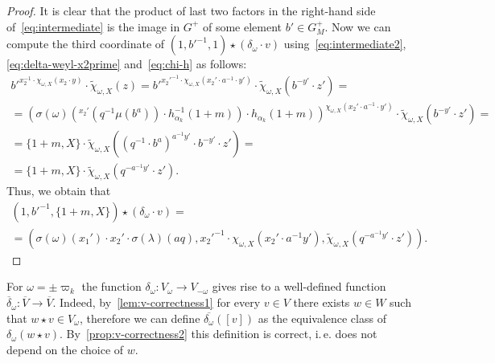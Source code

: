 \begin{proof}
It is clear that the product of last two factors in the right-hand side of~\eqref{eq:intermediate} is
 the image in $G^+$ of some element $b' \in G_M^+$.
Now we can compute the third coordinate of $(1, {b'}^{-1}, 1) \star (\delta_\omega \cdot v)$ using~\eqref{eq:intermediate2}, \eqref{eq:delta-weyl-x2prime} and~\eqref{eq:chi-h} as follows:
\begin{multline*}
 {b'}^{x_2^{-1} \cdot \chi_{\omega, X}(x_2 \cdot y) } \cdot \widetilde{\chi}_{\omega, X}(z) =
 {b'}^{{x_2'}^{-1} \cdot \chi_{\omega, X}(x_2' \cdot a^{-1} \cdot y') } \cdot \widetilde{\chi}_{\omega, X}(b^{-y'} \cdot z') = \\
 = \left(\sigma(\omega)\left( {}^{x_2'}(q^{-1} \mu(b^a)) \cdot h^{-1}_{\alpha_k}(1+m)\right) \cdot h_{\alpha_k}(1+m)\right)^{\chi_{\omega, X}(x_2' \cdot a^{-1} \cdot y')} \cdot \widetilde{\chi}_{\omega, X}(b^{-y'} \cdot z') = \\
 = \{1+m, X\} \cdot \widetilde{\chi}_{\omega, X}\left( \left( q^{-1} \cdot b^a \right)^{a^{-1}y'} \cdot b^{-y'} \cdot z' \right) = \\
 = \{1+m, X\} \cdot \widetilde{\chi}_{\omega, X}(q^{-a^{-1}y'} \cdot z').
\end{multline*}
Thus, we obtain that
\begin{multline*}
 (1, {b'}^{-1}, \{1 + m, X\}) \star (\delta_\omega \cdot v) = \\ =
  (\sigma(\omega)(x_1') \cdot x_2' \cdot \sigma(\lambda)(aq), x_2'^{-1} \cdot \chi_{\omega, X}(x_2' \cdot a^{-1} y'), \widetilde{\chi}_{\omega, X}(q^{-a^{-1}y'} \cdot z')).
\end{multline*}

 \end{proof}

For $\omega = \pm \varpi_k$ the function $\delta_\omega \colon V_{\omega} \to V_{-\omega}$ gives rise to a well-defined function $\overline{\delta}_\omega \colon \overline{V} \to \overline{V}.$
Indeed, by~\cref{lem:v-correctness1} for every $v \in V$ there exists $w \in W$ such that $w \star v \in V_\omega$, therefore
we can define $\overline{\delta_\omega}([v])$ as the equivalence class of $\delta_{\omega}(w \star v)$.
By~\cref{prop:v-correctness2} this definition is correct, i.\,e. does not depend on the choice of $w$.

